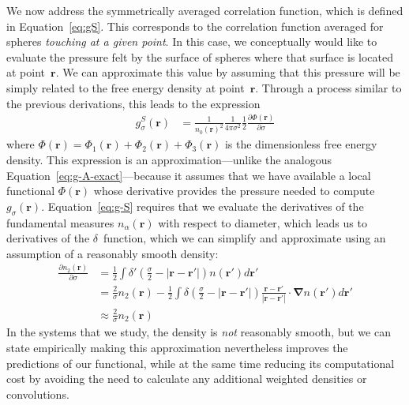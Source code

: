 \documentclass[letterpaper,twocolumn,amsmath,amssymb,pre]{revtex4-1}
\newcommand{\rr}{\textbf{r}}
\begin{document}
We now address the symmetrically averaged correlation function, which
is defined in Equation~\ref{eq:gS}.  This corresponds to the
correlation function averaged for spheres \emph{touching at a given
  point}.  In this case, we conceptually would like to evaluate the
pressure felt by the surface of spheres where that surface is located
at point~$\rr$.  We can approximate this value by assuming that this
pressure will be simply related to the free energy density at
point~$\rr$.  Through a process similar to the previous derivations, this
leads to the expression
\begin{align}
  g_\sigma^S(\rr)%
  &= \frac{1}{n_0(\rr)^2}\frac{1}{ 4\pi \sigma^2}\frac12
  \frac{\partial \Phi(\rr)}{\partial \sigma} \label{eq:g-S}
\end{align}
where $\Phi(\rr) = \Phi_1(\rr) + \Phi_2(\rr) + \Phi_3(\rr)$ is the
dimensionless free energy density.  This expression is an
approximation---unlike the analogous
Equation~\ref{eq:g-A-exact}---because it assumes that we have
available a local functional $\Phi(\rr)$ whose derivative provides the
pressure needed to compute $g_\sigma(\rr)$.  Equation~\ref{eq:g-S}
requires that we evaluate the derivatives of the fundamental measures
$n_\alpha(\rr)$ with respect to diameter, which leads us to
derivatives of the $\delta$~function, which we can simplify and
approximate using an assumption of a reasonably smooth density:
\begin{align}
  \frac{\partial n_2(\rr)}{\partial \sigma}
  &= \frac12 \int \delta'(\frac\sigma2 - |\rr-\rr'|) n(\rr')d\rr' \\
  &= \frac2{\sigma}n_2(\rr) - \frac12 \int \delta\left(\frac\sigma2 - |\rr-\rr'|\right)
  \frac{\rr-\rr'}{|\rr-\rr'|}\cdot\mathbf{\nabla}n(\rr')d\rr' \\
  &\approx \frac{2}{\sigma}n_2(\rr)
\end{align}
In the systems that we study, the density is \emph{not} reasonably
smooth, but we can state empirically making this approximation
nevertheless improves the predictions of our functional, while at the
same time reducing its computational cost by avoiding the need to
calculate any additional weighted densities or convolutions.
\end{document}
